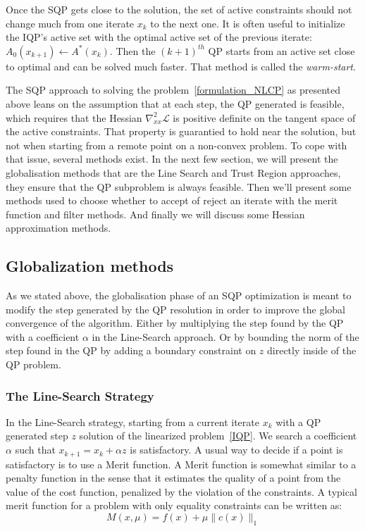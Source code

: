 Once the SQP gets close to the solution, the set of active constraints should not change much from one iterate $x_k$ to the next one.
It is often useful to initialize the IQP's active set with the optimal active set of the previous iterate: $\mathit{A}_0(x_{k+1})\leftarrow\mathit{A}^*(x_k)$. Then the ${(k+1)}^{th}$ QP starts from an active set close to optimal and can be solved much faster.
That method is called the \textit{warm-start}.

The SQP approach to solving the problem~\ref{formulation_NLCP} as presented above leans on the assumption that at each step, the QP generated is feasible,
which requires that the Hessian $\nabla_{xx}^2\mathcal{L}$ is positive definite on the tangent space of the active constraints.
That property is guarantied to hold near the solution, but not when starting from a remote point on a non-convex problem.
To cope with that issue, several methods exist.
In the next few section, we will present the globalisation methods that are the Line Search and Trust Region approaches, they ensure that the QP subproblem is always feasible.
Then we'll present some methods used to choose whether to accept of reject an iterate with the merit function and filter methods.
And finally we will discuss some Hessian approximation methods.

\subsection{Globalization methods}
\label{sub:globalization_methods}

As we stated above, the globalisation phase of an SQP optimization is meant to modify the step generated by the QP resolution in order to improve the global convergence of the algorithm.
Either by multiplying the step found by the QP with a coefficient $\alpha$ in the Line-Search approach.
Or by bounding the norm of the step found in the QP by adding a boundary constraint on $z$ directly inside of the QP problem.

\subsubsection{The Line-Search Strategy}
In the Line-Search strategy, starting from a current iterate $x_k$ with a QP generated step $z$ solution of the linearized problem~\ref{IQP}.
We search a coefficient $\alpha$ such that $x_{k+1}=x_k+\alpha z$ is satisfactory.
A usual way to decide if a point is satisfactory is to use a Merit function.
A Merit function is somewhat similar to a penalty function in the sense that it estimates the quality of a point from the value of the cost function, penalized by the violation of the constraints.
A typical merit function for a problem with only equality constraints can be written as:
\begin{equation}
  M(x,\mu) = f(x)+\mu \|c(x)\|_1
\end{equation}

